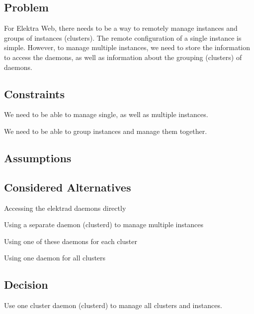 \subsection*{Problem}

For Elektra Web, there needs to be a way to remotely manage instances and groups of instances (clusters). The remote configuration of a single instance is simple. However, to manage multiple instances, we need to store the information to access the daemons, as well as information about the grouping (clusters) of daemons.

\subsection*{Constraints}


\begin{DoxyItemize}
\item We need to be able to manage single, as well as multiple instances.
\item We need to be able to group instances and manage them together.
\end{DoxyItemize}

\subsection*{Assumptions}

\subsection*{Considered Alternatives}


\begin{DoxyItemize}
\item Accessing the elektrad daemons directly
\item Using a separate daemon (clusterd) to manage multiple instances
\begin{DoxyItemize}
\item Using one of these daemons for each cluster
\item Using one daemon for all clusters
\end{DoxyItemize}
\end{DoxyItemize}

\subsection*{Decision}

Use one cluster daemon (clusterd) to manage all clusters and instances.

